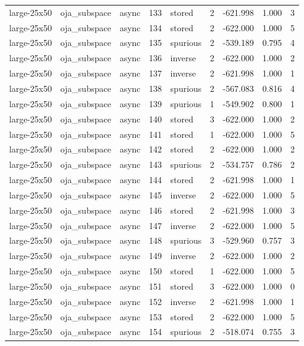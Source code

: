 \begin{tabular}{lllrlrrrr}
large-25x50 & oja\_subspace & async & 133 & stored & 2 & -621.998 & 1.000 & 3 \\
large-25x50 & oja\_subspace & async & 134 & stored & 2 & -622.000 & 1.000 & 5 \\
large-25x50 & oja\_subspace & async & 135 & spurious & 2 & -539.189 & 0.795 & 4 \\
large-25x50 & oja\_subspace & async & 136 & inverse & 2 & -622.000 & 1.000 & 2 \\
large-25x50 & oja\_subspace & async & 137 & inverse & 2 & -621.998 & 1.000 & 1 \\
large-25x50 & oja\_subspace & async & 138 & spurious & 2 & -567.083 & 0.816 & 4 \\
large-25x50 & oja\_subspace & async & 139 & spurious & 1 & -549.902 & 0.800 & 1 \\
large-25x50 & oja\_subspace & async & 140 & stored & 3 & -622.000 & 1.000 & 2 \\
large-25x50 & oja\_subspace & async & 141 & stored & 1 & -622.000 & 1.000 & 5 \\
large-25x50 & oja\_subspace & async & 142 & stored & 2 & -622.000 & 1.000 & 2 \\
large-25x50 & oja\_subspace & async & 143 & spurious & 2 & -534.757 & 0.786 & 2 \\
large-25x50 & oja\_subspace & async & 144 & stored & 2 & -621.998 & 1.000 & 1 \\
large-25x50 & oja\_subspace & async & 145 & inverse & 2 & -622.000 & 1.000 & 5 \\
large-25x50 & oja\_subspace & async & 146 & stored & 2 & -621.998 & 1.000 & 3 \\
large-25x50 & oja\_subspace & async & 147 & inverse & 2 & -622.000 & 1.000 & 5 \\
large-25x50 & oja\_subspace & async & 148 & spurious & 3 & -529.960 & 0.757 & 3 \\
large-25x50 & oja\_subspace & async & 149 & inverse & 2 & -622.000 & 1.000 & 2 \\
large-25x50 & oja\_subspace & async & 150 & stored & 1 & -622.000 & 1.000 & 5 \\
large-25x50 & oja\_subspace & async & 151 & stored & 3 & -622.000 & 1.000 & 0 \\
large-25x50 & oja\_subspace & async & 152 & inverse & 2 & -621.998 & 1.000 & 1 \\
large-25x50 & oja\_subspace & async & 153 & stored & 2 & -622.000 & 1.000 & 5 \\
large-25x50 & oja\_subspace & async & 154 & spurious & 2 & -518.074 & 0.755 & 3 \\

\end{tabular}
